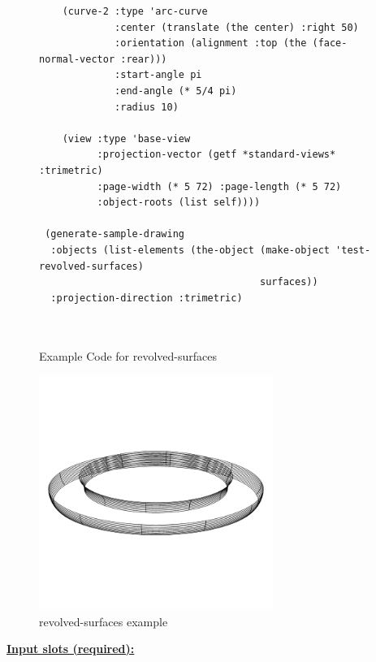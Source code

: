 \documentclass [11pt]{book}
\begin{document}
\begin{itemize}
\begin{figure}
\begin{lrbox}{\boxedverb}
\begin{minipage}{\linewidth}
{\begin{verbatim}
    (curve-2 :type 'arc-curve
             :center (translate (the center) :right 50)
             :orientation (alignment :top (the (face-normal-vector :rear)))
             :start-angle pi
             :end-angle (* 5/4 pi)
             :radius 10)
    
    (view :type 'base-view
          :projection-vector (getf *standard-views* :trimetric)
          :page-width (* 5 72) :page-length (* 5 72)
          :object-roots (list self))))
 
 (generate-sample-drawing 
  :objects (list-elements (the-object (make-object 'test-revolved-surfaces)
                                      surfaces))
  :projection-direction :trimetric)
 
  
\end{verbatim}}
\end{minipage}
\end{lrbox}
\fbox{\usebox{\boxedverb}}

\caption{Example Code for revolved-surfaces}

\label{fig:example-code-revolved-surfaces}

\end{figure}

\begin{figure}
\begin{center}
\includegraphics[width=3in,height=3in]{../images/example-revolved-surfaces.pdf}
\end{center}

\caption{revolved-surfaces example}

\label{fig:revolved-surfaces}

\end{figure}





\textbf{
\underline{Input slots (required):}}


\end{itemize}
\end{document}
